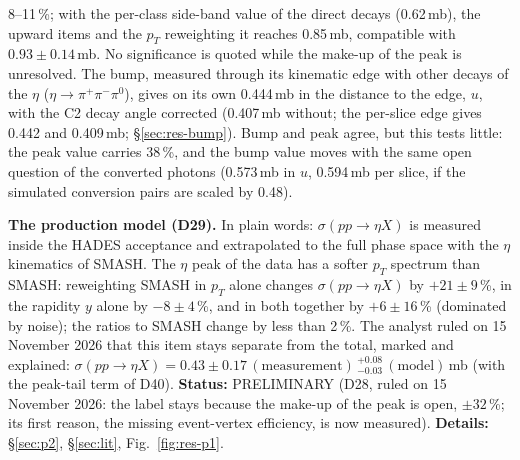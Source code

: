 \documentclass[11pt,a4paper]{article}
\newcommand{\piz}{\ensuremath{\pi^{0}}\xspace}
\newcommand{\pipi}{\ensuremath{\pi^{+}\pi^{-}}\xspace}
\newcommand{\sigeta}{\ensuremath{\sigma(pp\to\eta X)}\xspace}
\begin{document}
8--11\,\%; with the per-class side-band value of the direct decays (0.62\,mb), the upward items and the $p_T$ reweighting it reaches 0.85\,mb,
compatible with $0.93\pm0.14$\,mb. No significance is quoted while the make-up of the peak is unresolved.
The bump, measured through its kinematic edge with other decays of the $\eta$ ($\eta\to\pipi\piz$), gives on its own 0.444\,mb in the
distance to the edge, $u$, with the C2 decay angle corrected (0.407\,mb without; the per-slice edge gives 0.442 and 0.409\,mb;
\S\ref{sec:res-bump}). Bump and peak agree, but this tests little: the peak value carries 38\,\%, and the bump value moves with the same open
question of the converted photons (0.573\,mb in $u$, 0.594\,mb per slice, if the simulated conversion pairs are scaled by 0.48).

\textbf{The production model (D29).} In plain words: \sigeta is measured inside the HADES acceptance and extrapolated to the full phase space
with the $\eta$ kinematics of SMASH. The $\eta$ peak of the data has a softer $p_T$ spectrum than SMASH: reweighting SMASH in $p_T$ alone
changes \sigeta by $+21\pm9$\,\%, in the rapidity $y$ alone by $-8\pm4$\,\%, and in both together by $+6\pm16$\,\% (dominated by noise); the
ratios to SMASH change by less than 2\,\%. The analyst ruled on 15 November 2026 that this item stays separate from the total, marked and
explained: $\sigeta=0.43\pm0.17\,(\mathrm{measurement})\,^{+0.08}_{-0.03}\,(\mathrm{model})$\,mb (with the peak-tail term of D40).
\textbf{Status:} PRELIMINARY (D28, ruled on 15 November 2026: the label stays because the make-up of the peak is open, $\pm32$\,\%; its first
reason, the missing event-vertex efficiency, is now measured). \textbf{Details:} \S\ref{sec:p2}, \S\ref{sec:lit}, Fig.~\ref{fig:res-p1}.
\end{document}
